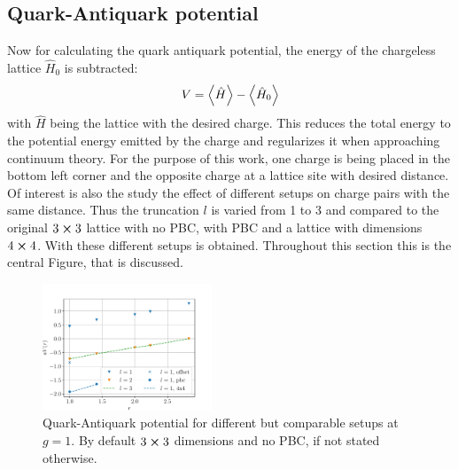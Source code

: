\subsection{Quark-Antiquark potential}
Now for calculating the quark antiquark potential, the energy of the chargeless lattice $\hat{H}_{0}$ is subtracted:
\begin{align}
  V = \Braket{\hat{H}} - \Braket{\hat{H}_{0}}
\end{align}
with $\hat{H}$ being the lattice with the desired charge. This reduces the total energy to the potential energy emitted by the charge and regularizes it when approaching continuum theory. %
For the purpose of this work, one charge is being placed in the bottom left corner and the opposite charge at a lattice site with desired distance. Of interest is also the study the effect of different setups on charge pairs with the same distance. Thus the truncation $l$ is varied from 1 to 3 and compared to the original $3 \cross 3$ lattice with no PBC, with PBC and a lattice with dimensions $4\cross 4$. With these different setups  is obtained. Throughout this section this is the central Figure, that is discussed.
\begin{figure}[h]
	\begin{center}
		\includegraphics[width=0.45\textwidth]{images/quark_antiquark_potential_normal_g.pdf}
	\end{center}
	\caption{Quark-Antiquark potential for different but comparable setups at $g=\num{1}$. By default $3\cross3$ dimensions and no PBC, if not stated otherwise.}\label{fig:qqbar}
\end{figure}


